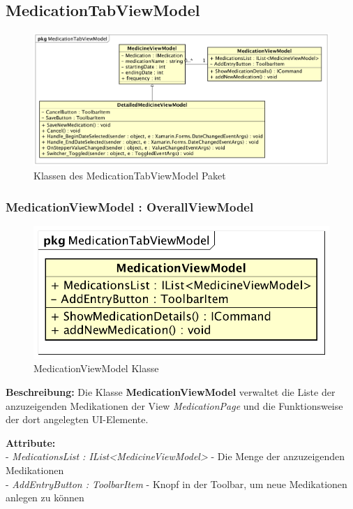 \documentclass[a4paper]{scrreprt}
\begin{document}
\subsection{MedicationTabViewModel}
\begin{figure}[H]
\centering
\includegraphics[width=0.75\textheight]{graphics/Klassendiagramme/ViewModel/MedicationTabViewModel.png}
\caption{Klassen des MedicationTabViewModel Paket}
\end{figure}

\subsubsection{MedicationViewModel : OverallViewModel}
\begin{figure}[H]
\centering
\includegraphics[width=0.65\textheight]{graphics/Klassendiagramme/ViewModel/MedicationViewModel.png}
\caption{MedicationViewModel Klasse}
\end{figure}

\textbf{Beschreibung:} Die Klasse \textbf{MedicationViewModel} verwaltet die Liste der anzuzeigenden Medikationen der View \textit{MedicationPage} und die Funktionsweise der dort angelegten UI-Elemente.

\textbf{Attribute:}\\
- \textit{MedicationsList : IList<MedicineViewModel>} - Die Menge der anzuzeigenden Medikationen\\
- \textit{AddEntryButton : ToolbarItem} - Knopf in der Toolbar, um neue Medikationen anlegen zu können\\
\end{document}
